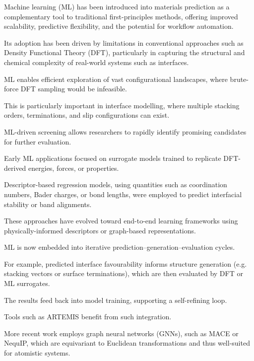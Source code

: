 
Machine learning (ML) has been introduced into materials prediction as a complementary tool to traditional
first-principles methods, offering improved scalability, predictive flexibility, and the potential for workflow
automation.

Its adoption has been driven by limitations in conventional approaches such as Density Functional Theory (DFT),
particularly in capturing the structural and chemical complexity of real-world systems such as interfaces.


ML enables efficient exploration of vast configurational landscapes, where brute-force DFT sampling would be infeasible.

This is particularly important in interface modelling, where multiple stacking orders, terminations, and slip
configurations can exist.

ML-driven screening allows researchers to rapidly identify promising candidates for further evaluation.


Early ML applications focused on surrogate models trained to replicate DFT-derived energies, forces, or properties.

Descriptor-based regression models, using quantities such as coordination numbers, Bader charges, or bond lengths, were
employed to predict interfacial stability or band alignments.

These approaches have evolved toward end-to-end learning frameworks using physically-informed descriptors or graph-based
representations.


ML is now embedded into iterative prediction--generation--evaluation cycles.

For example, predicted interface favourability informs structure generation (e.g. stacking vectors or surface
terminations), which are then evaluated by DFT or ML surrogates.

The results feed back into model training, supporting a self-refining loop.

Tools such as ARTEMIS benefit from such integration.


More recent work employs graph neural networks (GNNs), such as MACE or NequIP, which are equivariant to Euclidean
transformations and thus well-suited for atomistic systems.

